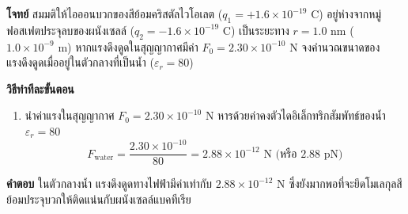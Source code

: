 \begin{worked}
\textbf{โจทย์} สมมติให้ไอออนบวกของสีย้อมคริสตัลไวโอเลต ($q_1 = +1.6 \times 10^{-19}\text{ C}$) อยู่ห่างจากหมู่ฟอสเฟตประจุลบของผนังเซลล์ ($q_2 = -1.6 \times 10^{-19}\text{ C}$) เป็นระยะทาง $r = 1.0\text{ nm}$ ($1.0 \times 10^{-9}\text{ m}$) หากแรงดึงดูดในสุญญากาศมีค่า $F_0 = 2.30 \times 10^{-10}\text{ N}$ จงคำนวณขนาดของแรงดึงดูดเมื่ออยู่ในตัวกลางที่เป็นน้ำ ($\varepsilon_r = 80$)

\textbf{วิธีทำทีละขั้นตอน}
\begin{enumerate}
    \item นำค่าแรงในสุญญากาศ $F_0 = 2.30 \times 10^{-10}\text{ N}$ หารด้วยค่าคงตัวไดอิเล็กทริกสัมพัทธ์ของน้ำ $\varepsilon_r = 80$
    \begin{equation*}
        F_{\text{water}} = \frac{2.30 \times 10^{-10}}{80} = 2.88 \times 10^{-12}\text{ N (หรือ } 2.88\text{ pN)}
    \end{equation*}
\end{enumerate}
\textbf{คำตอบ} ในตัวกลางน้ำ แรงดึงดูดทางไฟฟ้ามีค่าเท่ากับ $2.88 \times 10^{-12}\text{ N}$ ซึ่งยังมากพอที่จะยึดโมเลกุลสีย้อมประจุบวกให้ติดแน่นกับผนังเซลล์แบคทีเรีย
\end{worked}

